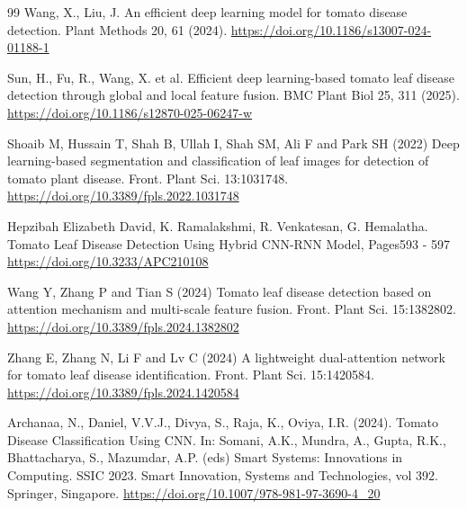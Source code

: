 \documentclass[pdflatex,sn-mathphys-num,iicol]{sn-jnl} %
\theoremstyle{thmstyleone}
\theoremstyle{thmstyletwo}
\theoremstyle{thmstylethree}
\begin{document}
\begin{thebibliography}{99}
 Wang, X., Liu, J. An efficient deep learning model for tomato disease detection. Plant Methods 20, 61 (2024).
\url{https://doi.org/10.1186/s13007-024-01188-1}

Sun, H., Fu, R., Wang, X. et al. Efficient deep learning-based tomato leaf disease detection through global and local feature fusion. BMC Plant Biol 25, 311 (2025).
\url{https://doi.org/10.1186/s12870-025-06247-w}

 Shoaib M, Hussain T, Shah B, Ullah I, Shah SM, Ali F and Park SH (2022) Deep learning-based segmentation and classification of leaf images for detection of tomato plant disease. Front. Plant Sci. 13:1031748.
\url{https://doi.org/10.3389/fpls.2022.1031748}

Hepzibah Elizabeth David, K. Ramalakshmi, R. Venkatesan, G. Hemalatha. Tomato Leaf Disease Detection Using Hybrid CNN-RNN Model, Pages593 - 597
\url{https://doi.org/10.3233/APC210108}

 Wang Y, Zhang P and Tian S (2024) Tomato leaf disease detection based on attention mechanism and multi-scale feature fusion. Front. Plant Sci. 15:1382802.
\url{https://doi.org/10.3389/fpls.2024.1382802}

Zhang E, Zhang N, Li F and Lv C (2024) A lightweight dual-attention network for tomato leaf disease identification. Front. Plant Sci. 15:1420584.
\url{https://doi.org/10.3389/fpls.2024.1420584}

Archanaa, N., Daniel, V.V.J., Divya, S., Raja, K., Oviya, I.R. (2024). Tomato Disease Classification Using CNN. In: Somani, A.K., Mundra, A., Gupta, R.K., Bhattacharya, S., Mazumdar, A.P. (eds) Smart Systems: Innovations in Computing. SSIC 2023. Smart Innovation, Systems and Technologies, vol 392. Springer, Singapore.
\url{https://doi.org/10.1007/978-981-97-3690-4_20}




\end{thebibliography}
\end{document}
